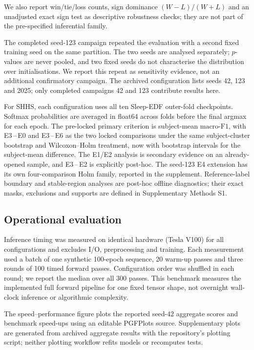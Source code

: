 \documentclass[11pt,a4paper]{article}
\newcommand{\mf}{\ensuremath{\mathrm{macro\text{-}F1}}}
\begin{document}
We also report win/tie/loss counts, sign dominance $(W-L)/(W+L)$ and an unadjusted exact sign test as
descriptive robustness checks; they are not part of the pre-specified inferential family.

The completed seed-123 campaign repeated the evaluation with a second fixed training seed on the
same partition. The two seeds are analysed separately; $p$-values are never pooled,
and two fixed seeds do not characterise the distribution over initialisations. We report this repeat
as sensitivity evidence, not an additional confirmatory campaign. The archived configuration lists
seeds 42, 123 and 2025; only completed campaigns 42 and 123 contribute results here.

For SHHS, each configuration uses all ten Sleep-EDF outer-fold checkpoints. Softmax probabilities are
averaged in float64 across folds before the final argmax for each epoch. The pre-locked primary criterion
is subject-mean \mf, with E3\,--\,E0 and E3\,--\,E6 as the two locked comparisons under the same
subject-cluster bootstrap and Wilcoxon--Holm treatment, now with bootstrap intervals for the
subject-mean difference. The E1/E2 analysis is secondary evidence on an already-opened sample,
and E3\,--\,E2 is explicitly post-hoc. The seed-123 E4 extension has its own four-comparison Holm
family, reported in the supplement. Reference-label boundary and stable-region analyses are post-hoc
offline diagnostics; their exact masks, exclusions and supports are defined in Supplementary Methods S1.

\subsection{Operational evaluation}

Inference timing was measured on identical hardware (Tesla V100) for all configurations and excludes
I/O, preprocessing and training. Each measurement used a batch of one synthetic 100-epoch sequence,
20 warm-up passes and three rounds of 100 timed forward passes. Configuration order was shuffled in
each round; we report the median over all 300 passes. This benchmark measures the implemented full
forward pipeline for one fixed tensor shape, not overnight wall-clock inference or algorithmic
complexity.

The speed--performance figure plots the reported seed-42 aggregate scores and benchmark speed-ups
using an editable PGFPlots source. Supplementary plots are generated from archived aggregate results
with the repository's plotting script; neither plotting workflow refits models or recomputes tests.
\end{document}
